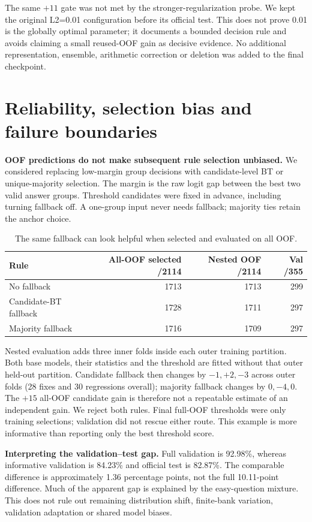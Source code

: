 \documentclass[11pt,a4paper]{article}
\newcommand{\pageheading}[1]{\section{#1}}
\begin{document}
The same $+11$ gate was not met by the stronger-regularization probe. We kept
the original L2=0.01 configuration before its official test. This does not
prove 0.01 is the globally optimal parameter; it documents a bounded decision
rule and avoids claiming a small reused-OOF gain as decisive evidence. No
additional representation, ensemble, arithmetic correction or deletion was
added to the final checkpoint.

\newpage
\pageheading{Reliability, selection bias and failure boundaries}
\textbf{OOF predictions do not make subsequent rule selection unbiased.}
We considered replacing low-margin group decisions with candidate-level BT or
unique-majority selection. The margin is the raw logit gap between the best two
valid answer groups. Threshold candidates were fixed in advance, including
turning fallback off. A one-group input never needs fallback; majority ties
retain the anchor choice.

\begin{table}[h]\centering
\caption{The same fallback can look helpful when selected and evaluated on all OOF.}
\begin{tabular}{lrrr}\toprule
Rule & All-OOF selected /2114 & Nested OOF /2114 & Val /355 \\\midrule
No fallback & 1713 & 1713 & 299 \\
Candidate-BT fallback & 1728 & 1711 & 297 \\
Majority fallback & 1716 & 1709 & 297 \\
\bottomrule\end{tabular}
\end{table}

Nested evaluation adds three inner folds inside each outer training partition.
Both base models, their statistics and the threshold are fitted without that
outer held-out partition. Candidate fallback then changes by $-1,+2,-3$ across
outer folds (28 fixes and 30 regressions overall); majority fallback changes by
$0,-4,0$. The $+15$ all-OOF candidate gain is therefore not a repeatable estimate
of an independent gain. We reject both rules. Final full-OOF thresholds were
only training selections; validation did not rescue either route. This example
is more informative than reporting only the best threshold score.

\textbf{Interpreting the validation--test gap.} Full validation is
92.98\%, whereas informative validation is 84.23\% and official test is
82.87\%. The comparable difference is approximately 1.36 percentage points,
not the full 10.11-point difference. Much of the apparent gap is explained by
the easy-question mixture. This does not rule out remaining distribution shift,
finite-bank variation, validation adaptation or shared model biases.
\end{document}
